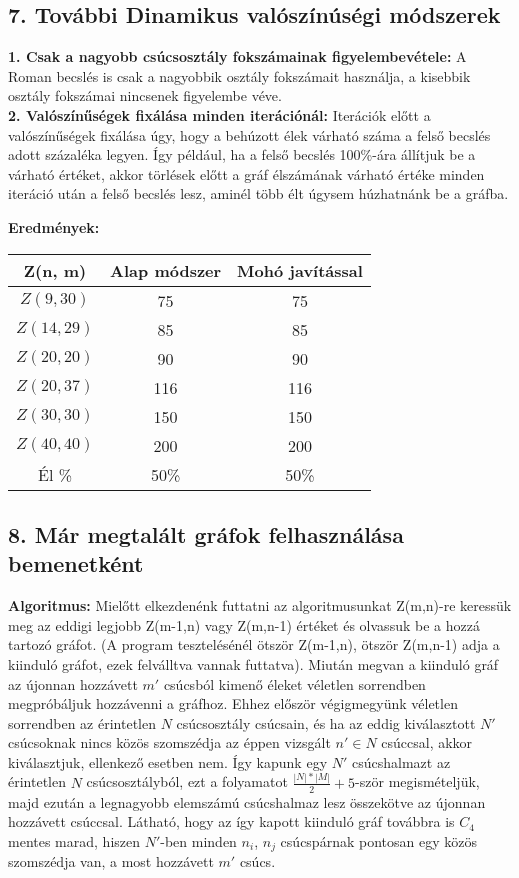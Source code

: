 \documentclass[12pt,a4paper]{article}
\begin{document}
\subsection*{7. További Dinamikus valószínúségi módszerek}

\textbf{1. Csak a nagyobb csúcsosztály fokszámainak figyelembevétele:} A Roman becslés is csak a nagyobbik osztály fokszámait használja, a kisebbik osztály fokszámai nincsenek figyelembe véve.\\
\textbf{2. Valószínűségek fixálása minden iterációnál:} Iterációk előtt a valószínűségek fixálása úgy, hogy a behúzott élek várható száma a felső becslés adott százaléka legyen. Így például, ha a felső becslés 100\%-ára állítjuk be a várható értéket, akkor törlések előtt a gráf élszámának várható értéke minden iteráció után a felső becslés lesz, aminél több élt úgysem húzhatnánk be a gráfba.

\textbf{Eredmények:}
\begin{table}[H]
\centering
\begin{tabular}{|c|c|c|}
\hline
\textbf{Z(n, m)} & \textbf{Alap módszer} & \textbf{Mohó javítással} \\
\hline
$Z(9,30)$  & 75 & 75 \\
$Z(14, 29)$ & 85 & 85 \\
$Z(20, 20)$ & 90 & 90 \\
$Z(20, 37)$ & 116 & 116 \\
$Z(30, 30)$ & 150 & 150 \\
$Z(40, 40)$ & 200 & 200 \\
\hline
Él \% & 50\% & 50\% \\
\hline
\end{tabular}
\end{table}

\subsection*{8. Már megtalált gráfok felhasználása bemenetként}
\textbf{Algoritmus:} Mielőtt elkezdenénk futtatni az algoritmusunkat Z(m,n)-re keressük meg az eddigi legjobb Z(m-1,n) vagy Z(m,n-1) értéket és olvassuk be a hozzá tartozó gráfot. (A program tesztelésénél ötször Z(m-1,n), ötször Z(m,n-1) adja a kiinduló gráfot, ezek felválltva vannak futtatva). Miután megvan a kiinduló gráf az újonnan hozzávett $m'$ csúcsból kimenő éleket véletlen sorrendben megpróbáljuk hozzávenni a gráfhoz. Ehhez először végigmegyünk véletlen sorrendben az érintetlen $N$ csúcsosztály csúcsain, és ha az eddig kiválasztott $N'$ csúcsoknak nincs közös szomszédja az éppen vizsgált $n' \in N$ csúccsal, akkor kiválasztjuk, ellenkező esetben nem.  Így kapunk egy $N'$ csúcshalmazt az érintetlen $N$ csúcsosztályból, ezt a folyamatot $\tfrac{|N|*|M|}{2}+5$-ször megismételjük, majd ezután a legnagyobb elemszámú csúcshalmaz lesz összekötve az újonnan hozzávett csúccsal. Látható, hogy az így kapott kiinduló gráf továbbra is $C_4$ mentes marad, hiszen $N'$-ben minden $n_i$, $n_j$ csúcspárnak pontosan egy közös szomszédja van, a most hozzávett $m'$ csúcs.
\end{document}
